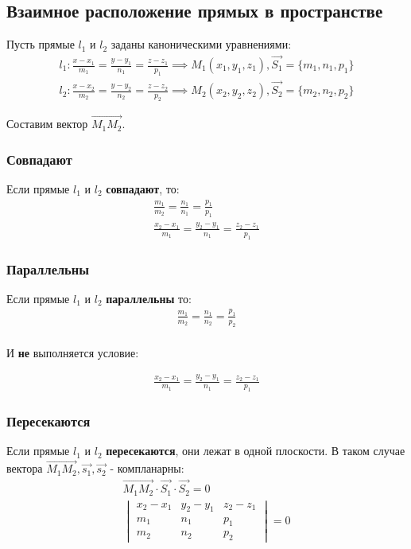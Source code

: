 \subsection{Взаимное расположение прямых в пространстве}

Пусть прямые $l_1$ и $l_2$ заданы каноническими уравнениями:
\begin{gather*}  
  l_1: \frac{x - x_1}{m_1} = \frac{y - y_1}{n_1} = \frac{z - z_1}{p_1} \implies M_1(x_1, y_1, z_1), \vec{S_1} = \{m_1, n_1, p_1\} \\
  l_2: \frac{x - x_2}{m_2} = \frac{y - y_2}{n_2} = \frac{z - z_2}{p_2} \implies M_2(x_2, y_2, z_2), \vec{S_2} = \{m_2, n_2, p_2\}
\end{gather*}

Составим вектор $\overrightarrow{M_1M_2}$.

\subsubsection{Совпадают}
Если прямые $l_1$ и $l_2$ \textbf{совпадают}, то:
\begin{gather*}
    \frac{m_1}{m_2} = \frac{n_1}{n_1} = \frac{p_1}{p_1} \\
    \frac{x_2 - x_1}{m_1} = \frac{y_2 - y_1}{n_1} = \frac{z_2 - z_1}{p_1}
\end{gather*}

\subsubsection{Параллельны}
Если прямые $l_1$ и $l_2$ \textbf{параллельны} то: 
\begin{gather*}
  \frac{m_1}{m_2} = \frac{n_1}{n_2} = \frac{p_1}{p_2} \\
\end{gather*}
\begin{center}
  И \textbf{не} выполняется условие:
\end{center}
\begin{gather*}
  \frac{x_2 - x_1}{m_1} = \frac{y_2 - y_1}{n_1} = \frac{z_2 - z_1}{p_1}
\end{gather*}

\subsubsection{Пересекаются}
Если прямые $l_1$ и $l_2$ \textbf{пересекаются}, они лежат в одной плоскости.
В таком случае вектора $\overrightarrow{M_1M_2}, \vec{s_1}, \vec{s_2}$ - компланарны:
\begin{gather*}
  \overrightarrow{M_1M_2} \cdot \vec{S_1} \cdot \vec{S_2} = 0 \\
  \boxed{
    \begin{vmatrix}
      x_2 - x_1 & y_2 - y_1 & z_2 - z_1 \\
      m_1 & n_1 & p_1 \\
      m_2 & n_2 & p_2
    \end{vmatrix} = 0
  }
\end{gather*}

